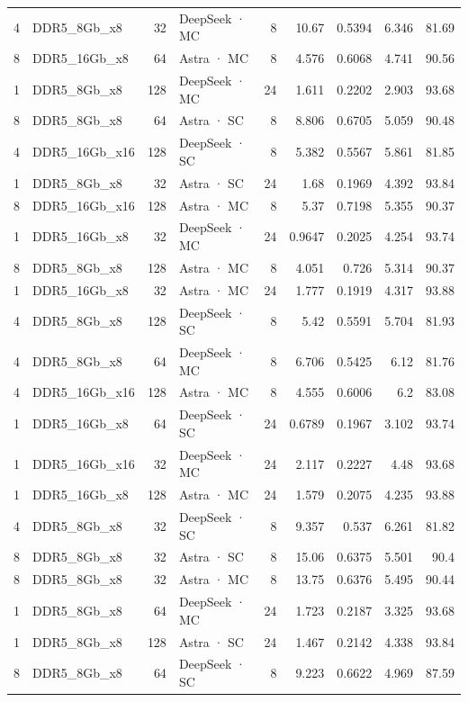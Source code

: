 \begin{tabular}{rlrlrrrrr}
4 & DDR5\_8Gb\_x8 & 32 & DeepSeek · MC & 8 & 10.67 & 0.5394 & 6.346 & 81.69 \\
8 & DDR5\_16Gb\_x8 & 64 & Astra · MC & 8 & 4.576 & 0.6068 & 4.741 & 90.56 \\
1 & DDR5\_8Gb\_x8 & 128 & DeepSeek · MC & 24 & 1.611 & 0.2202 & 2.903 & 93.68 \\
8 & DDR5\_8Gb\_x8 & 64 & Astra · SC & 8 & 8.806 & 0.6705 & 5.059 & 90.48 \\
4 & DDR5\_16Gb\_x16 & 128 & DeepSeek · SC & 8 & 5.382 & 0.5567 & 5.861 & 81.85 \\
1 & DDR5\_8Gb\_x8 & 32 & Astra · SC & 24 & 1.68 & 0.1969 & 4.392 & 93.84 \\
8 & DDR5\_16Gb\_x16 & 128 & Astra · MC & 8 & 5.37 & 0.7198 & 5.355 & 90.37 \\
1 & DDR5\_16Gb\_x8 & 32 & DeepSeek · MC & 24 & 0.9647 & 0.2025 & 4.254 & 93.74 \\
8 & DDR5\_8Gb\_x8 & 128 & Astra · MC & 8 & 4.051 & 0.726 & 5.314 & 90.37 \\
1 & DDR5\_16Gb\_x8 & 32 & Astra · MC & 24 & 1.777 & 0.1919 & 4.317 & 93.88 \\
4 & DDR5\_8Gb\_x8 & 128 & DeepSeek · SC & 8 & 5.42 & 0.5591 & 5.704 & 81.93 \\
4 & DDR5\_8Gb\_x8 & 64 & DeepSeek · MC & 8 & 6.706 & 0.5425 & 6.12 & 81.76 \\
4 & DDR5\_16Gb\_x16 & 128 & Astra · MC & 8 & 4.555 & 0.6006 & 6.2 & 83.08 \\
1 & DDR5\_16Gb\_x8 & 64 & DeepSeek · SC & 24 & 0.6789 & 0.1967 & 3.102 & 93.74 \\
1 & DDR5\_16Gb\_x16 & 32 & DeepSeek · MC & 24 & 2.117 & 0.2227 & 4.48 & 93.68 \\
1 & DDR5\_16Gb\_x8 & 128 & Astra · MC & 24 & 1.579 & 0.2075 & 4.235 & 93.88 \\
4 & DDR5\_8Gb\_x8 & 32 & DeepSeek · SC & 8 & 9.357 & 0.537 & 6.261 & 81.82 \\
8 & DDR5\_8Gb\_x8 & 32 & Astra · SC & 8 & 15.06 & 0.6375 & 5.501 & 90.4 \\
8 & DDR5\_8Gb\_x8 & 32 & Astra · MC & 8 & 13.75 & 0.6376 & 5.495 & 90.44 \\
1 & DDR5\_8Gb\_x8 & 64 & DeepSeek · MC & 24 & 1.723 & 0.2187 & 3.325 & 93.68 \\
1 & DDR5\_8Gb\_x8 & 128 & Astra · SC & 24 & 1.467 & 0.2142 & 4.338 & 93.84 \\
8 & DDR5\_8Gb\_x8 & 64 & DeepSeek · SC & 8 & 9.223 & 0.6622 & 4.969 & 87.59 \\

\end{tabular}
